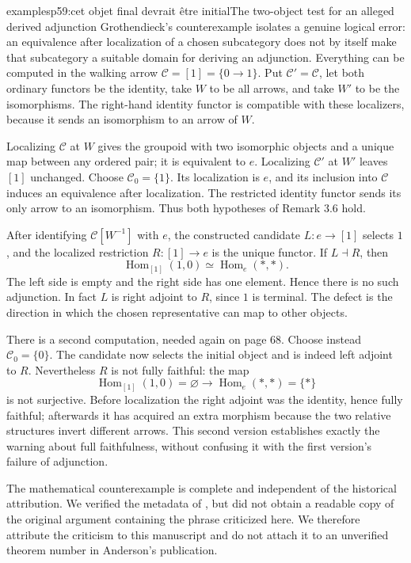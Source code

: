 \begin{dcomment}{examples}{p59:cet objet final devrait être initial}{The two-object test for an alleged derived adjunction}
Grothendieck's counterexample isolates a genuine logical error: an equivalence after localization of a chosen subcategory does not by itself make that subcategory a suitable domain for deriving an adjunction. Everything can be computed in the walking arrow $\mathcal C=[1]=\{0\to1\}$. Put $\mathcal C'=\mathcal C$, let both ordinary functors be the identity, take $W$ to be all arrows, and take $W'$ to be the isomorphisms. The right-hand identity functor is compatible with these localizers, because it sends an isomorphism to an arrow of $W$.

Localizing $\mathcal C$ at $W$ gives the groupoid with two isomorphic objects and a unique map between any ordered pair; it is equivalent to $e$. Localizing $\mathcal C'$ at $W'$ leaves $[1]$ unchanged. Choose $\mathcal C_0=\{1\}$. Its localization is $e$, and its inclusion into $\mathcal C$ induces an equivalence after localization. The restricted identity functor sends its only arrow to an isomorphism. Thus both hypotheses of Remark 3.6 hold.

After identifying $\mathcal C[W^{-1}]$ with $e$, the constructed candidate $L:e\to[1]$ selects $1$, and the localized restriction $R:[1]\to e$ is the unique functor. If $L\dashv R$, then
\[
 \operatorname{Hom}_{[1]}(1,0)
       \simeq\operatorname{Hom}_{e}(*,*) .
\]
The left side is empty and the right side has one element. Hence there is no such adjunction. In fact $L$ is right adjoint to $R$, since $1$ is terminal. The defect is the direction in which the chosen representative can map to other objects.

There is a second computation, needed again on page 68. Choose instead $\mathcal C_0=\{0\}$. The candidate now selects the initial object and is indeed left adjoint to $R$. Nevertheless $R$ is not fully faithful: the map
\[
 \operatorname{Hom}_{[1]}(1,0)=\varnothing
       \longrightarrow\operatorname{Hom}_{e}(*,*)=\{*\}
\]
is not surjective. Before localization the right adjoint was the identity, hence fully faithful; afterwards it has acquired an extra morphism because the two relative structures invert different arrows. This second version establishes exactly the warning about full faithfulness, without confusing it with the first version's failure of adjunction.

The mathematical counterexample is complete and independent of the historical attribution. We verified the metadata of \citet{Anderson1978}, but did not obtain a readable copy of the original argument containing the phrase criticized here. We therefore attribute the criticism to this manuscript and do not attach it to an unverified theorem number in Anderson's publication.
\end{dcomment}

